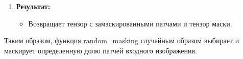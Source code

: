 \begin{itemize}
\begin{itemize}
\begin{enumerate}
                \item \textbf{Результат:}
                \begin{itemize}
                    \item Возвращает  тензор  с  замаскированными  патчами и тензор  маски.
                \end{itemize}
            \end{enumerate}
        
            Таким  образом,  функция  random\_masking  случайным  образом  выбирает  и  маскирует  определенную  долю  патчей  входного  изображения.
    
    \end{itemize}

\end{itemize}

\newpage
